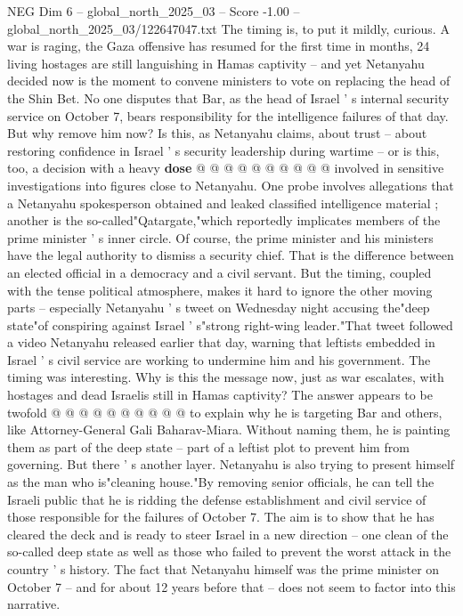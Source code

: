\begin{textsample}{NEG Dim 6 – global\_north\_2025\_03 – Score -1.00 – global\_north\_2025\_03/122647047.txt}
The timing is, to put it mildly, curious.
A war is raging, the Gaza offensive has resumed for the first time in months, 24 living hostages are still languishing in Hamas captivity -- and yet Netanyahu decided now is the moment to convene ministers to vote on replacing the head of the Shin Bet.
No one disputes that Bar, as the head of Israel ' s internal security service on October 7, bears responsibility for the intelligence failures of that day.
But why remove him now?
Is this, as Netanyahu claims, about trust -- about restoring confidence in Israel ' s security leadership during wartime -- or is this, too, a decision with a heavy \textbf{dose} @ @ @ @ @ @ @ @ @ @ involved in sensitive investigations into figures close to Netanyahu.
One probe involves allegations that a Netanyahu spokesperson obtained and leaked classified intelligence material ; another is the so-called"Qatargate,"which reportedly implicates members of the prime minister ' s inner circle.
Of course, the prime minister and his ministers have the legal authority to dismiss a security chief.
That is the difference between an elected official in a democracy and a civil servant.
But the timing, coupled with the tense political atmosphere, makes it hard to ignore the other moving parts -- especially Netanyahu ' s tweet on Wednesday night accusing the"deep state"of conspiring against Israel ' s"strong right-wing leader."That tweet followed a video Netanyahu released earlier that day, warning that leftists embedded in Israel ' s civil service are working to undermine him and his government.
The timing was interesting.
Why is this the message now, just as war escalates, with hostages and dead Israelis still in Hamas captivity?
The answer appears to be twofold @ @ @ @ @ @ @ @ @ @ to explain why he is targeting Bar and others, like Attorney-General Gali Baharav-Miara.
Without naming them, he is painting them as part of the deep state -- part of a leftist plot to prevent him from governing.
But there ' s another layer.
Netanyahu is also trying to present himself as the man who is"cleaning house."By removing senior officials, he can tell the Israeli public that he is ridding the defense establishment and civil service of those responsible for the failures of October 7.
The aim is to show that he has cleared the deck and is ready to steer Israel in a new direction -- one clean of the so-called deep state as well as those who failed to prevent the worst attack in the country ' s history.
The fact that Netanyahu himself was the prime minister on October 7 -- and for about 12 years before that -- does not seem to factor into this narrative.

\end{textsample}
